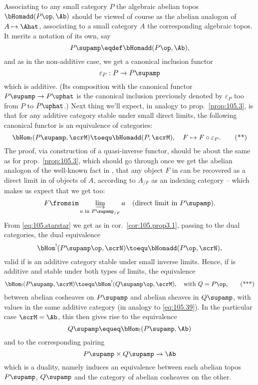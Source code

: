 Associating to any small  category $P$ the
algebraic abelian topos $\bHomadd(P\op,\Ab)$ should be viewed of
course as the abelian analogon of $A\mapsto\Ahat$, associating to a
small category $A$ the corresponding algebraic topos. It merits a
notation of its own, say
\[P\supamp\eqdef \bHomadd(P\op,\Ab),\]
and as in the non-additive case, we get a canonical inclusion functor
\[\varepsilon_P:P\to P\supamp\]
which is additive. (Its composition with the canonical functor
$P\supamp\to P\uphat$ is the canonical inclusion
previously denoted by $\varepsilon_P$ too from $P$ to $P\uphat$.) Next
thing we'll expect, in analogy to prop.\ \ref{prop:105.3}, is that for
any additive category \scrM{} stable under small direct limits, the
following canonical functor is an equivalence of categories:
\begin{equation}
  \label{eq:105.starstar}
  \bHom_!(P\supamp,\scrM) \toequ \bHomadd(P,\scrM), \quad
  F\mapsto F\circ\varepsilon_P.\tag{**}
\end{equation}
The proof, via construction of a quasi-inverse functor, should be
about the same as for prop.\ \ref{prop:105.3}, which should go through
once we get the abelian analogon of the well-known fact in \Ahat, that
any object $F$ in \Ahat{} can be recovered as a direct limit in
\Ahat{} of objects of $A$, according to $A_{/F}$ as an indexing
category -- which makes us expect that we get too:
\[F \fromsim \varinjlim_{\text{$a$ in $P\supamp_{/F}$}} a\quad
(\text{direct limit in $P\supamp$}).\]
From \eqref{eq:105.starstar} we get as in cor.\ \ref{cor:105.prop3.1},
passing to the dual categories, the dual equivalence
\[\bHom^!({P\supamp}\op,\scrN) \toequ \bHomadd(P\op,\scrN),\]
valid if \scrN{} is an additive category stable under small inverse
limits. Hence, if \scrM{} is additive and stable under both types of
limits, the equivalence
\begin{equation}
  \label{eq:105.starstarstar}
  \bHom_!(P\supamp,\scrM)\toequ \bHom^!({Q\supamp}\op,\scrM), \quad
  \text{with $Q=P\op$,}\tag{***}
\end{equation}
between abelian cosheaves on $P\supamp$ and abelian sheaves in
$Q\supamp$, with values in the same additive category (in analogy to
\eqref{eq:105.39}). In the particular case $\scrM=\Ab$, this then
gives rise to the equivalence
\[Q\supamp \equeq \bHom_!(P\supamp,\Ab)\]
and to the corresponding pairing
\[P\supamp\times Q\supamp\to\Ab\]
which is a duality, namely induces an equivalence between each abelian
topos $P\supamp$, $Q\supamp$ and the category of abelian
cosheaves on the other.

